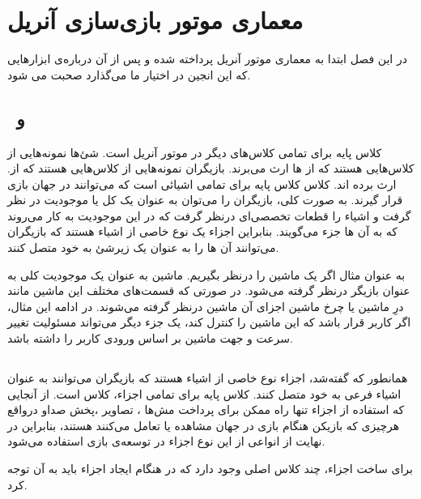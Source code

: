 \chapter {معماری  موتور بازی‌سازی آنریل}
در این فصل ابتدا به معماری موتور آنریل پرداخته شده و پس از آن درباره‌ی ابزار‌هایی که این انجین در اختیار ما می‌گذارد صحبت می شود.

\section { \, و \, }

کلاس پایه برای تمامی کلاس‌های دیگر در موتور آنریل
است.
‌شئ‌ها
‌نمونه‌هایی از کلاس‌هایی هستند که از 
ها ارث می‌برند.
بازیگران
نمونه‌هایی از کلاس‌هایی هستند که از.
ارث برده اند.
کلاس 
کلاس پایه برای تمامی اشیائی است که می‌توانند در جهان بازی قرار گیرند.
به صورت کلی، بازیگران را می‌توان به عنوان یک کل یا موجودیت در نظر گرفت و اشیاء را قطعات تخصصی‌ای درنظر گرفت که در این موجودیت به کار می‌روند
که به آن ها جزء 
می‌گویند.
بنابراین اجزاء یک نوع خاصی از اشیاء هستند که بازیگران می‌توانند آن ها را به عنوان یک زیر‌شئ
به خود متصل کنند.

به عنوان مثال اگر یک ماشین را درنظر بگیریم. ماشین به عنوان یک موجودیت کلی به عنوان بازیگر درنظر گرفته می‌شود. در صورتی که قسمت‌های مختلف این ماشین مانند درِ ماشین یا چرخ ماشین اجزای آن ماشین درنظر گرفته می‌شوند. در ادامه این مثال، اگر کاربر قرار باشد که این ماشین را کنترل کند، یک جزء دیگر می‌تواند مسئولیت تغییر سرعت و جهت ماشین بر اساس ورودی کاربر را داشته باشد.
\cite{UnrealEngineArchitecture, UnrealEngineComponents}

\section{}
همانطور که گفته‌شد، اجزاء نوع خاصی از اشیاء هستند که بازیگران می‌توانند به عنوان اشیاء فرعی به خود متصل کنند.
کلاس پایه برای تمامی اجزاء، کلاس
است. از آنجایی که استفاده از اجزاء تنها راه ممکن برای پرداخت
مش‌ها
، تصاویر
،پخش صداو درواقع هرچیزی که بازیکن هنگام بازی در جهان مشاهده یا تعامل می‌کنند هستند، بنابراین در نهایت از انواعی از این نوع اجزاء در توسعه‌ی بازی استفاده می‌شود.

برای ساخت اجزاء، چند کلاس اصلی وجود دارد که در هنگام ایجاد اجزاء باید به آن توجه کرد.

